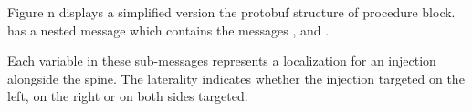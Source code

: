 Figure n displays a simplified version the protobuf structure of  procedure block.
 has a nested message  which contains the messages ,  and .

Each variable in these sub-messages represents a localization for an injection alongside the spine.
The laterality indicates whether the injection targeted on the left, on the right or on both sides targeted.



